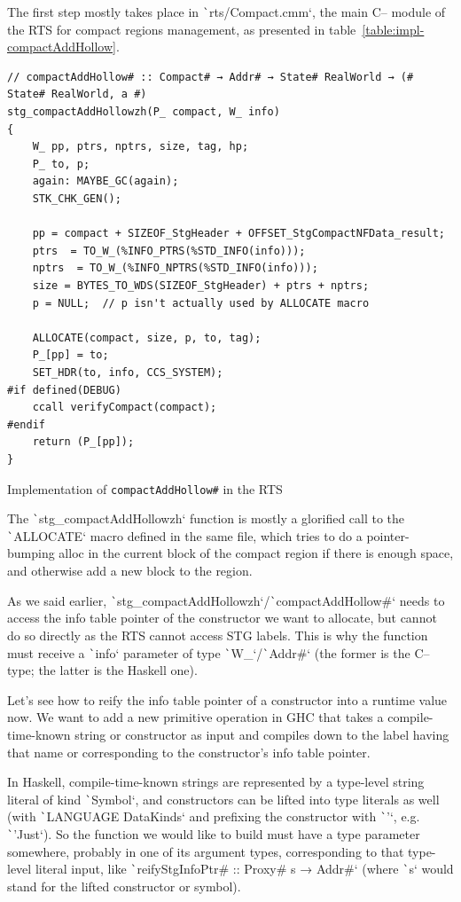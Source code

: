 \documentclass[english]{jflart}
\begin{document}
The first step mostly takes place in \texttt`rts/Compact.cmm`, the main C-- module of the RTS for compact regions management, as presented in table~\ref{table:impl-compactAddHollow}.

\begin{table}[H]
\small
\begin{verbatim}
// compactAddHollow# :: Compact# → Addr# → State# RealWorld → (# State# RealWorld, a #)
stg_compactAddHollowzh(P_ compact, W_ info)
{
    W_ pp, ptrs, nptrs, size, tag, hp;
    P_ to, p;
    again: MAYBE_GC(again);
    STK_CHK_GEN();

    pp = compact + SIZEOF_StgHeader + OFFSET_StgCompactNFData_result;
    ptrs  = TO_W_(%INFO_PTRS(%STD_INFO(info)));
    nptrs  = TO_W_(%INFO_NPTRS(%STD_INFO(info)));
    size = BYTES_TO_WDS(SIZEOF_StgHeader) + ptrs + nptrs;
    p = NULL;  // p isn't actually used by ALLOCATE macro

    ALLOCATE(compact, size, p, to, tag);
    P_[pp] = to;
    SET_HDR(to, info, CCS_SYSTEM);
#if defined(DEBUG)
    ccall verifyCompact(compact);
#endif
    return (P_[pp]);
}
\end{verbatim}
\caption{Implementation of \texttt{compactAddHollow\#} in the RTS}
\label{table:impl-compactAddHollow}
\end{table}

The \texttt`stg_compactAddHollowzh` function is mostly a glorified call to the \texttt`ALLOCATE` macro defined in the same file, which tries to do a pointer-bumping alloc in the current block of the compact region if there is enough space, and otherwise add a new block to the region.

As we said earlier, \texttt`stg_compactAddHollowzh`/\texttt`compactAddHollow#` needs to access the info table pointer of the constructor we want to allocate, but cannot do so directly as the RTS cannot access STG labels. This is why the function must receive a \texttt`info` parameter of type \texttt`W_`/\texttt`Addr#` (the former is the C-- type; the latter is the Haskell one).

Let's see how to reify the info table pointer of a constructor into a runtime value now. We want to add a new primitive operation in GHC that takes a compile-time-known string or constructor as input and compiles down to the label having that name or corresponding to the constructor's info table pointer.

In Haskell, compile-time-known strings are represented by a type-level string literal of kind \texttt`Symbol`, and constructors can be lifted into type literals as well (with \texttt`LANGUAGE DataKinds` and prefixing the constructor with \texttt`'`, e.g. \texttt`'Just`). So the function we would like to build must have a type parameter somewhere, probably in one of its argument types, corresponding to that type-level literal input, like \texttt`reifyStgInfoPtr# :: Proxy# s → Addr#` (where \texttt`s` would stand for the lifted constructor or symbol).
\end{document}
